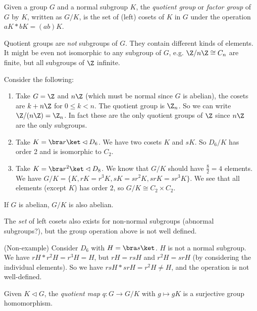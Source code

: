 \documentclass[a4paper]{article}
\begin{document}
  \begin{defi}
    Given a group $G$ and a normal subgroup $K$, the \emph{quotient group} or \emph{factor group} of $G$ by $K$, written as $G/K$, is the set of (left) cosets of $K$ in $G$ under the operation $aK*bK = (ab)K$.
  \end{defi}

  \note Quotient groups are \emph{not} subgroups of $G$. They contain different kinds of elements. It might be even not isomorphic to any subgroup of $G$, e.g. $\Z/n\Z \cong C_n$ are finite, but all subgroups of $\Z$ infinite.

  \begin{eg}
    Consider the following:
    \begin{enumerate}
      \item Take $G = \Z$ and $n\Z$ (which must be normal since $G$ is abelian), the cosets are $k + n\Z$ for $0 \leq k < n$. The quotient group is $\Z_n$. So we can write $\Z/(n\Z) = \Z_n$. In fact these are the only quotient groups of $\Z$ since $n\Z$ are the only subgroups.
      \item Take $K = \bra r\ket \lhd D_6$. We have two cosets $K$ and $sK$. So $D_6/K$ has order 2 and is isomorphic to $C_2$.
      \item Take $K = \bra r^2\ket \lhd D_8$. We know that $G/K$ should have $\frac{8}{2} = 4$ elements. We have $G/K = \{ K, rK = r^3 K, sK = sr^2K, srK = sr^3K\}$. We see that all elements (except $K$) has order $2$, so $G/K\cong C_2\times C_2$.
    \end{enumerate}
  \end{eg}
  \note If $G$ is abelian, $G/K$ is also abelian.

  \note The \emph{set} of left cosets also exists for non-normal subgroups (abnormal subgroups?), but the group operation above is not well defined.

  \begin{eg}
    (Non-example) Consider $D_6$ with $H = \bra s\ket$. $H$ is not a normal subgroup. We have $rH * r^2 H = r^3 H = H$, but $rH = rsH$ and $r^2H = srH$ (by considering the individual elements). So we have $rsH * srH = r^2 H\not= H$, and the operation is not well-defined.
  \end{eg}

  \begin{lemma}
    Given $K\lhd G$, the \emph{quotient map} $q: G\rightarrow G/K$ with $g\mapsto gK$ is a surjective group homomorphism.
  \end{lemma}
\end{document}
